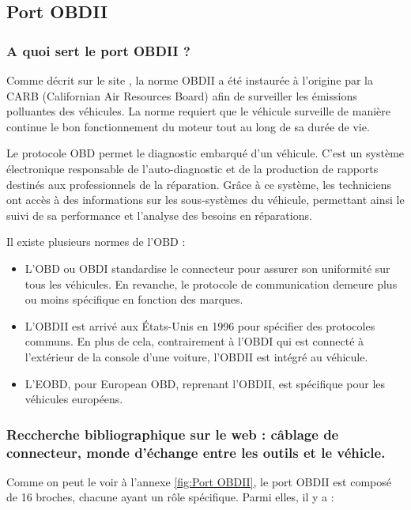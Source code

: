 \documentclass{rapportECC}
\begin{document}
\subsection{Port OBDII}

\subsubsection*{A quoi sert le port OBDII ?}

Comme décrit sur le site \cite{klavkarr}, la norme OBDII a été instaurée à l'origine par la CARB (Californian Air Resources Board) afin de surveiller les émissions polluantes des véhicules. La norme requiert que le véhicule surveille de manière continue le bon fonctionnement du moteur tout au long de sa durée de vie.

Le protocole OBD permet le diagnostic embarqué d'un véhicule. C'est un système électronique responsable de l'auto-diagnostic et de la production de rapports destinés aux professionnels de la réparation. Grâce à ce système, les techniciens ont accès à des informations sur les sous-systèmes du véhicule, permettant ainsi le suivi de sa performance et l'analyse des besoins en réparations.

Il existe plusieurs normes de l'OBD : 
\begin{itemize}
    \item L'OBD ou OBDI standardise le connecteur pour assurer son uniformité sur tous les véhicules. En revanche, le protocole de communication demeure plus ou moins spécifique en fonction des marques.
    \item L'OBDII est arrivé aux États-Unis en 1996 pour spécifier des protocoles communs. En plus de cela, contrairement à l'OBDI qui est connecté à l’extérieur de la console d'une voiture, l'OBDII est intégré au véhicule.
    \item L'EOBD, pour European OBD, reprenant l'OBDII, est spécifique pour les véhicules européens.
\end{itemize}

    
\subsubsection*{Reccherche bibliographique sur le web : câblage de connecteur, monde d'échange entre les outils et le véhicle.}

Comme on peut le voir à l'annexe \ref{fig:Port OBDII}, le port OBDII est composé de 16 broches, chacune ayant un rôle spécifique. Parmi elles, il y a :
\end{document}

